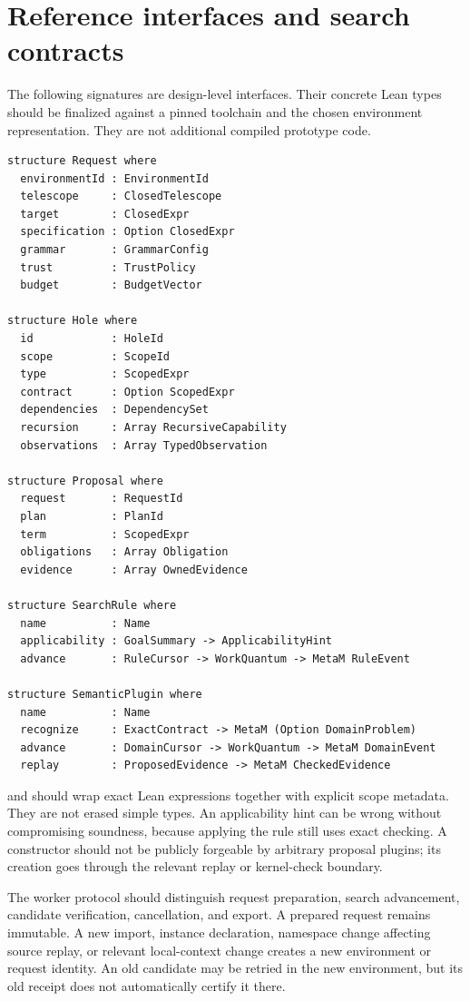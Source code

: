 \documentclass[11pt,letterpaper]{article}
\newcommand{\code}[1]{\texttt{\detokenize{#1}}}
\theoremstyle{definition}
\theoremstyle{remark}
\begin{document}
\appendix
\section{Reference interfaces and search contracts}
\label{app:interfaces}

The following signatures are design-level interfaces. Their concrete Lean types should be finalized against a pinned toolchain and the chosen environment representation. They are not additional compiled prototype code.

\Needspace{453pt}
\begin{lstlisting}
structure Request where
  environmentId : EnvironmentId
  telescope     : ClosedTelescope
  target        : ClosedExpr
  specification : Option ClosedExpr
  grammar       : GrammarConfig
  trust         : TrustPolicy
  budget        : BudgetVector

structure Hole where
  id            : HoleId
  scope         : ScopeId
  type          : ScopedExpr
  contract      : Option ScopedExpr
  dependencies  : DependencySet
  recursion     : Array RecursiveCapability
  observations  : Array TypedObservation

structure Proposal where
  request       : RequestId
  plan          : PlanId
  term          : ScopedExpr
  obligations   : Array Obligation
  evidence      : Array OwnedEvidence

structure SearchRule where
  name          : Name
  applicability : GoalSummary -> ApplicabilityHint
  advance       : RuleCursor -> WorkQuantum -> MetaM RuleEvent

structure SemanticPlugin where
  name          : Name
  recognize     : ExactContract -> MetaM (Option DomainProblem)
  advance       : DomainCursor -> WorkQuantum -> MetaM DomainEvent
  replay        : ProposedEvidence -> MetaM CheckedEvidence
\end{lstlisting}

\code{ClosedExpr} and \code{ScopedExpr} should wrap exact Lean expressions together with explicit scope metadata. They are not erased simple types. An applicability hint can be wrong without compromising soundness, because applying the rule still uses exact checking. A \code{CheckedEvidence} constructor should not be publicly forgeable by arbitrary proposal plugins; its creation goes through the relevant replay or kernel-check boundary.

The worker protocol should distinguish request preparation, search advancement, candidate verification, cancellation, and export. A prepared request remains immutable. A new import, instance declaration, namespace change affecting source replay, or relevant local-context change creates a new environment or request identity. An old candidate may be retried in the new environment, but its old receipt does not automatically certify it there.
\end{document}
